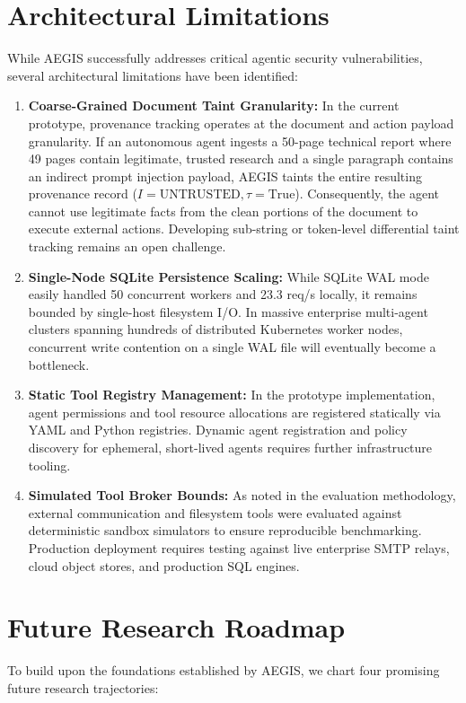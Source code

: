 \section{Architectural Limitations}
While AEGIS successfully addresses critical agentic security vulnerabilities, several architectural limitations have been identified:
\begin{enumerate}
    \item \textbf{Coarse-Grained Document Taint Granularity:} In the current prototype, provenance tracking operates at the document and action payload granularity. If an autonomous agent ingests a 50-page technical report where 49 pages contain legitimate, trusted research and a single paragraph contains an indirect prompt injection payload, AEGIS taints the entire resulting provenance record ($I = \text{UNTRUSTED}, \tau = \text{True}$). Consequently, the agent cannot use legitimate facts from the clean portions of the document to execute external actions. Developing sub-string or token-level differential taint tracking remains an open challenge.
    \item \textbf{Single-Node SQLite Persistence Scaling:} While SQLite WAL mode easily handled 50 concurrent workers and 23.3 req/s locally, it remains bounded by single-host filesystem I/O. In massive enterprise multi-agent clusters spanning hundreds of distributed Kubernetes worker nodes, concurrent write contention on a single WAL file will eventually become a bottleneck.
    \item \textbf{Static Tool Registry Management:} In the prototype implementation, agent permissions and tool resource allocations are registered statically via YAML and Python registries. Dynamic agent registration and policy discovery for ephemeral, short-lived agents requires further infrastructure tooling.
    \item \textbf{Simulated Tool Broker Bounds:} As noted in the evaluation methodology, external communication and filesystem tools were evaluated against deterministic sandbox simulators to ensure reproducible benchmarking. Production deployment requires testing against live enterprise SMTP relays, cloud object stores, and production SQL engines.
\end{enumerate}

\section{Future Research Roadmap}
To build upon the foundations established by AEGIS, we chart four promising future research trajectories:


